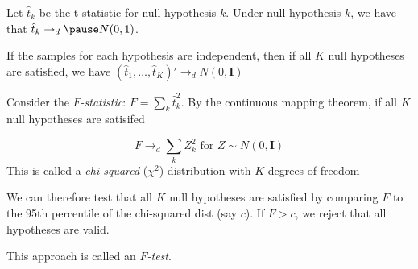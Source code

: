 \documentclass[11pt,english,handout]{beamer}
\newenvironment{wideitemize}{\itemize\addtolength{\itemsep}{10pt}}{\enditemize}
\begin{document}
\begin{frame}
	\begin{wideitemize}
		\item
		Let $\hat{t}_k$ be the t-statistic for null hypothesis $k$. Under null hypothesis $k$, we have that $\hat{t}_k \to_d \pause N(0,1)$.
		
		\item
		If the samples for each hypothesis are independent, then if all $K$ null hypotheses are satisfied, we have $(\hat{t}_1,\ldots,\hat{t}_K)' \to_d N(0, \mathbf{I})$
		
		\item
		Consider the \emph{$F$-statistic}: $F = \sum_k \hat{t}_k^2$. \pause By the continuous mapping theorem, if all $K$ null hypotheses are satisifed
		
		$$F \to_d  \sum_k Z_k^2 \text{ for } Z \sim N(0,\mathbf{I})$$
		This is called a \emph{chi-squared} ($\chi^2$) distribution with $K$ degrees of freedom 
		
		\item
		We can therefore test that all $K$ null  hypotheses are satisfied by comparing $F$ to the 95th percentile of the chi-squared dist (say $c$). If $F>c$, we reject that all hypotheses are valid. 
		
		\item
		This approach is called an $F$\emph{-test}.
				
	\end{wideitemize}
\end{frame}



%	
%	
%	
%	
%	
%	
\end{document}
